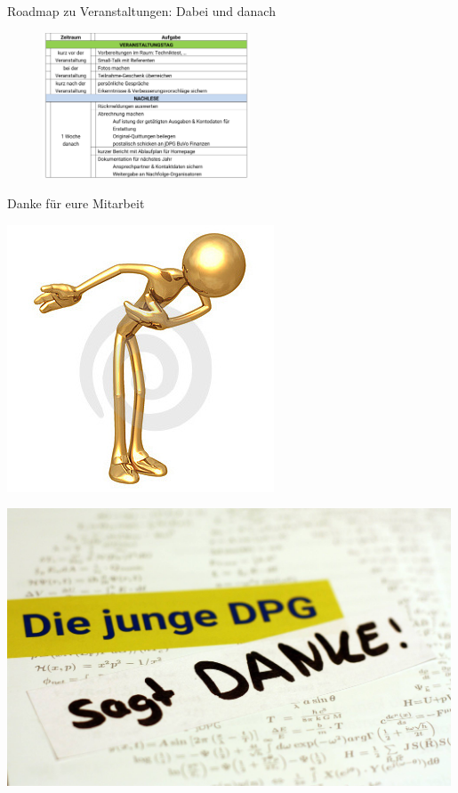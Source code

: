 \documentclass[
]{beamer}
\begin{document}
\begin{frame}{Roadmap zu Veranstaltungen: Dabei und danach}
  \begin{figure}
   \centering
   \includegraphics[width=0.55\textwidth]{figure/roadmap_veranstaltungstagUndDanach}
  \end{figure}
\end{frame}

\begin{frame}{Danke für eure Mitarbeit}
  \begin{minipage}[c]{0.35\textwidth}
    \includegraphics[]{figure/thank_you_1}
  \end{minipage}
  \hfill
  \begin{minipage}[c]{0.64\textwidth}
    \includegraphics[width=0.99\textwidth]{figure/20171206-Christina-Nolte-Merphi}
  \end{minipage}
\end{frame}
\end{document}
